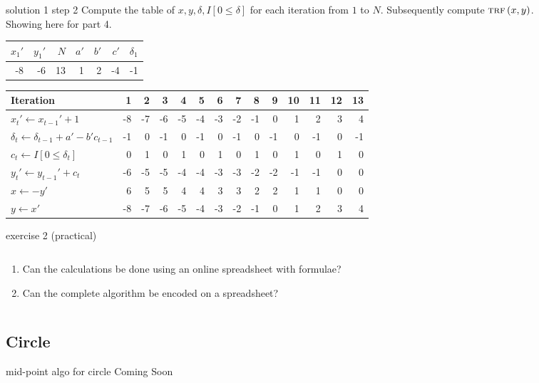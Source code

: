 \documentclass[aspectratio=169,xcolor={dvipsnames,svgnames}]{beamer}
\begin{document}
\begin{frame}[label={sec:org45f15cf}]{solution 1 step 2}
Compute the table of \(x,y,\delta,I[0\leqslant\delta]\)
for each iteration from \(1\) to \(N\).  Subsequently
compute \(\textsc{trf}\,(x,y)\).\\[0pt]
Showing here for part 4.

\begin{center}
\begin{tabular}{rrrrrrr}
\(x_1'\) & \(y_1'\) & \(N\) & \(a'\) & \(b'\) & \(c'\) & \(\delta_{1}\)\\[0pt]
\hline
-8 & -6 & 13 & 1 & 2 & -4 & -1\\[0pt]
\end{tabular}
\end{center}


\begin{center}
\begin{tabular}{lrrrrrrrrrrrrr}
Iteration & 1 & 2 & 3 & 4 & 5 & 6 & 7 & 8 & 9 & 10 & 11 & 12 & 13\\[0pt]
\hline
\(x_t'\gets x_{t-1}'+1\) & -8 & -7 & -6 & -5 & -4 & -3 & -2 & -1 & 0 & 1 & 2 & 3 & 4\\[0pt]
\(\delta_{t}\gets \delta_{t-1}+a'-b'c_{t-1}\) & -1 & 0 & -1 & 0 & -1 & 0 & -1 & 0 & -1 & 0 & -1 & 0 & -1\\[0pt]
\(c_{t}\gets I[0\leqslant\delta_{t}]\) & 0 & 1 & 0 & 1 & 0 & 1 & 0 & 1 & 0 & 1 & 0 & 1 & 0\\[0pt]
\(y_{t}'\gets y_{t-1}'+c_t\) & -6 & -5 & -5 & -4 & -4 & -3 & -3 & -2 & -2 & -1 & -1 & 0 & 0\\[0pt]
\hline
\(x\gets -y'\) & 6 & 5 & 5 & 4 & 4 & 3 & 3 & 2 & 2 & 1 & 1 & 0 & 0\\[0pt]
\(y\gets x'\) & -8 & -7 & -6 & -5 & -4 & -3 & -2 & -1 & 0 & 1 & 2 & 3 & 4\\[0pt]
\end{tabular}
\end{center}
\end{frame}

\begin{frame}[label={sec:org85b68a1}]{exercise 2 (practical)}
\begin{columns}
\begin{column}{.5\columnwidth}
\begin{enumerate}
\item Can the calculations be done using an online
spreadsheet with formulae?
\item Can the complete algorithm be encoded on a
spreadsheet?
\end{enumerate}
\end{column}
\end{columns}
\end{frame}

\subsection{Circle}
\label{sec:orge03cf44}


\begin{frame}[label={sec:orgbd2f433}]{mid-point algo for circle}
\centering
Coming Soon
\end{frame}
\end{document}
